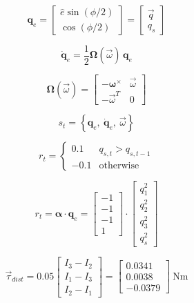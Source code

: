 \documentclass{article}
\begin{document}
\begin{equation}
\mathbf{q}_e =
\begin{bmatrix} \hat{e}\sin(\phi/2) \\ \cos(\phi/2) \end{bmatrix}
=
\begin{bmatrix} \vec{q} \\ q_s \end{bmatrix}
\end{equation}

\begin{equation}
\dot{\mathbf{q}}_e = \frac{1}{2}\boldsymbol{\Omega}(\vec{\omega})\,\mathbf{q}_e
\end{equation}

\begin{equation}
\boldsymbol{\Omega}(\vec{\omega}) =
\begin{bmatrix}
-\boldsymbol{\omega}^{\times} & \vec{\omega} \\
-\vec{\omega}^{T} & 0
\end{bmatrix}
\end{equation}

\begin{equation}
s_t = \left\{ \mathbf{q}_e,\ \dot{\mathbf{q}}_e,\ \vec{\omega} \right\}
\end{equation}

\begin{equation}
r_t =
\begin{cases}
0.1 & q_{s,t} > q_{s,t-1} \\
-0.1 & \text{otherwise}
\end{cases}
\end{equation}

\begin{equation}
r_t = \boldsymbol{\alpha} \cdot \mathbf{q}_e =
\begin{bmatrix} -1 \\ -1 \\ -1 \\ 1 \end{bmatrix}
\cdot
\begin{bmatrix} q_1^2 \\ q_2^2 \\ q_3^2 \\ q_s^2 \end{bmatrix}
\end{equation}

\begin{equation}
\vec{\tau}_{dist} = 0.05
\begin{bmatrix} I_3 - I_2 \\ I_1 - I_3 \\ I_2 - I_1 \end{bmatrix}
=
\begin{bmatrix} 0.0341 \\ 0.0038 \\ -0.0379 \end{bmatrix}\ \text{Nm}
\end{equation}
\end{document}
